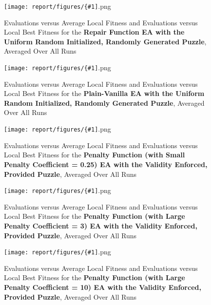 \documentclass[11pt]{article}
\newcommand{\fitnessplotcaption}[1]{\caption{Evaluations versus Average Local Fitness and Evaluations versus 
    Local Best Fitness for the \textbf{{#1}}, Averaged Over All Runs}}
\newcommand{\addgraphic}[1]{\centerline{\texttt{[image: report/figures/\{\#1]}.png}}}
\begin{document}
\begin{figure}
    \addgraphic{random_gen_uniform_random_bonus_graph}
    \fitnessplotcaption{Repair Function EA with the Uniform Random Initialized, Randomly Generated Puzzle}
    \label{fig:random_gen_uniform_random_bonus_graph}
\end{figure}

\begin{figure}
    \addgraphic{random_gen_uniform_random_vanilla_graph}
    \fitnessplotcaption{Plain-Vanilla EA with the Uniform Random Initialized, Randomly Generated Puzzle}
    \label{fig:random_gen_uniform_random_vanilla_graph}
\end{figure}

\begin{figure}
    \addgraphic{website_puzzle_validity_enforced_small_penalty_graph}
    \fitnessplotcaption{Penalty Function (with Small Penalty Coefficient = 0.25) EA with the Validity Enforced, Provided Puzzle}
    \label{fig:website_puzzle_validity_enforced_small_penalty_graph}
\end{figure}

\begin{figure}
    \addgraphic{website_puzzle_validity_enforced_graph}
    \fitnessplotcaption{Penalty Function (with Large Penalty Coefficient = 3) EA with the Validity Enforced, Provided Puzzle}
    \label{fig:website_puzzle_validity_enforced_med_penalty_graph}
\end{figure}

\begin{figure}
    \addgraphic{website_puzzle_validity_enforced_large_penalty_graph}
    \fitnessplotcaption{Penalty Function (with Large Penalty Coefficient = 10) EA with the Validity Enforced, Provided Puzzle}
    \label{fig:website_puzzle_validity_enforced_large_penalty_graph}
\end{figure}
\end{document}
